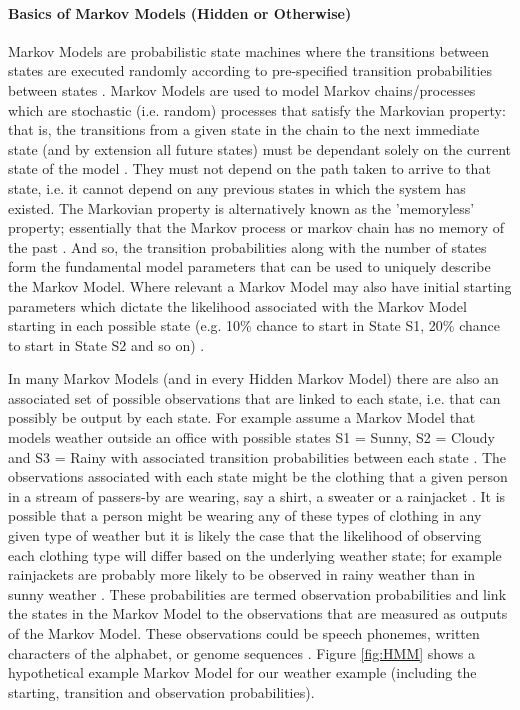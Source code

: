 \documentclass[]{article}
\begin{document}
\paragraph{Basics of Markov Models (Hidden or Otherwise)}

Markov Models are probabilistic state machines where the transitions between states are executed randomly according to pre-specified transition probabilities between states \cite{Jurafsky2017,Bobick2015,Gagniuc2017,OConnell2011,Rabiner1989}. Markov Models are used to model Markov chains/processes which are stochastic (i.e. random) processes that satisfy the Markovian property: that is, the transitions from a given state in the chain to the next immediate state (and by extension all future states) must be dependant solely on the current state of the model \cite{Jurafsky2017,Bobick2015,Bobick2015a,Gagniuc2017,OConnell2011,Rabiner1989}. They must not depend on the path taken to arrive to that state, i.e. it cannot depend on any previous states in which the system has existed. The Markovian property is alternatively known as the 'memoryless' property; essentially that the Markov process or markov chain has no memory of the past \cite{Jurafsky2017,Bobick2015,Bobick2015a,Gagniuc2017,OConnell2011,Rabiner1989}. And so, the transition probabilities along with the number of states form the fundamental model parameters that can be used to uniquely describe the Markov Model. Where relevant a Markov Model may also have initial starting parameters which dictate the likelihood associated with the Markov Model starting in each possible state (e.g. 10\% chance to start in State S1, 20\% chance to start in State S2 and so on) \cite{Jurafsky2017,Bobick2015,Bobick2015a,Gagniuc2017,OConnell2011,Rabiner1989}.

In many Markov Models (and in every Hidden Markov Model) there are also an associated set of possible observations that are linked to each state, i.e. that can possibly be output by each state. For example assume a Markov Model that models weather outside an office with possible states S1 = Sunny, S2 = Cloudy and S3 = Rainy with associated transition probabilities between each state \cite{Bobick2015}. The observations associated with each state might be the clothing that a given person in a stream of passers-by are wearing, say a shirt, a sweater or a rainjacket \cite{Bobick2015}. It is possible that a person might be wearing any of these types of clothing in any given type of weather but it is likely the case that the likelihood of observing each clothing type will differ based on the underlying weather state; for example rainjackets are probably more likely to be observed in rainy weather than in sunny weather \cite{Bobick2015}. These probabilities are termed observation probabilities and link the states in the Markov Model to the observations that are measured as outputs of the Markov Model. These observations could be speech phonemes, written characters of the alphabet, or genome sequences \cite{Rabiner1989,Altman2007}. Figure \ref{fig:HMM} shows a hypothetical example Markov Model for our weather example (including the starting, transition and observation probabilities).
\end{document}
